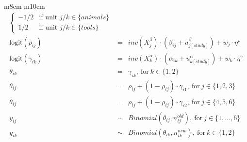 \documentclass{article}
\begin{document}
\begin{tabular}{ m{8cm} m{10cm}}
\[\begin{array}{rcl}
\begin{cases}
      -1/2 & \text{if unit $j/k$} \in \{animals\} \\ 
      1/2 & \text{if unit $j/k$} \in \{tools\}
    \end{cases}\\ 
    \mathrm{logit}(\rho_{ij}) & = & \mathit{inv}(X_j^{\beta}) \cdot (\beta_{ij} + u_{j[study]}^{\beta}) + w_{j} \cdot \eta^{\rho}\\ 
    \mathrm{logit}(\gamma_{ik}) & = & \mathit{inv}(X_k^{\alpha}) \cdot (\alpha_{ik} + u_{k[study]}^{\alpha}) + w_{k} \cdot \eta^{\gamma}\\    
    \theta_{ik} & = & \gamma_{ik},\ \mathrm{for}\ k \in \{1, 2\} \\
    \theta_{ij} & = & \rho_{ij} + (1-\rho_{ij}) \cdot \gamma_{i1},\ \mathrm{for}\ j \in \{1, 2, 3\} \\
    \theta_{ij} & = & \rho_{ij} + (1-\rho_{ij}) \cdot \gamma_{i2},\ \mathrm{for}\ j \in \{4, 5, 6\} \\
    y_{ij} & \sim & Binomial(\theta_{ij}, n_{ij}^{old}),\ \mathrm{for}\ j \in \{1, \ldots, 6\} \\
    y_{ik} & \sim & Binomial(\theta_{ik}, n_{ik}^{new}),\ \mathrm{for}\ k \in \{1, 2\} \\
  \end{array}
\]

\end{tabular}

\end{document}
